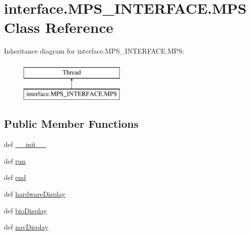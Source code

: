 \hypertarget{classinterface_1_1MPS__INTERFACE_1_1MPS}{}\section{interface.\+M\+P\+S\+\_\+\+I\+N\+T\+E\+R\+F\+A\+C\+E.\+M\+P\+S Class Reference}
\label{classinterface_1_1MPS__INTERFACE_1_1MPS}
Inheritance diagram for interface.\+M\+P\+S\+\_\+\+I\+N\+T\+E\+R\+F\+A\+C\+E.\+M\+P\+S\+:\begin{figure}[H]
\begin{center}
\leavevmode
\includegraphics[height=2.000000cm]{classinterface_1_1MPS__INTERFACE_1_1MPS}
\end{center}
\end{figure}
\subsection*{Public Member Functions}
\begin{DoxyCompactItemize}
\item 
def \hyperlink{classinterface_1_1MPS__INTERFACE_1_1MPS_a14e3c3c0348bd54317bf9883cec18bfd}{\+\_\+\+\_\+init\+\_\+\+\_\+}
\item 
def \hyperlink{classinterface_1_1MPS__INTERFACE_1_1MPS_afd3839277bb37e6e365b3bdbce3600b6}{run}
\item 
def \hyperlink{classinterface_1_1MPS__INTERFACE_1_1MPS_ae4d0a8cf4c577cf42c9e1948b5fedee9}{end}
\item 
def \hyperlink{classinterface_1_1MPS__INTERFACE_1_1MPS_af1b0852de8806b27592dab79d44a2916}{hardware\+Display}
\item 
def \hyperlink{classinterface_1_1MPS__INTERFACE_1_1MPS_aab098096679e010e58c2d3b20bd66ca4}{bio\+Display}
\item 
def \hyperlink{classinterface_1_1MPS__INTERFACE_1_1MPS_ad7aa0a5e40c93b9d818730655523db1e}{nav\+Display}
\end{DoxyCompactItemize}
